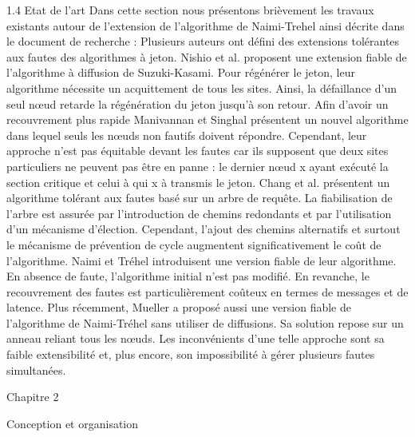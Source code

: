 \documentclass[a4paper,french,towsides,10pt]{book}
\begin{document}
1.4 Etat de l’art
Dans cette section nous présentons brièvement les travaux existants autour de l’extension de l’algorithme de Naimi-Trehel ainsi décrite dans le document de recherche :
Plusieurs auteurs ont défini des extensions tolérantes aux fautes des algorithmes à jeton. Nishio et al. proposent une extension fiable de l'algorithme à diffusion de Suzuki-Kasami.
Pour régénérer le jeton, leur algorithme nécessite un acquittement de tous les sites. Ainsi, la défaillance d'un seul nœud retarde la régénération du jeton jusqu'à son retour. Afin d'avoir un recouvrement plus rapide Manivannan et Singhal présentent un nouvel algorithme dans lequel seuls les nœuds non fautifs doivent répondre. Cependant, leur approche n'est pas équitable devant les fautes car ils supposent que deux sites particuliers ne peuvent pas être en panne : le dernier nœud x ayant exécuté la section critique et celui à qui x à transmis le jeton.
Chang et al. présentent un algorithme tolérant aux fautes basé sur un arbre de requête.
La fiabilisation de l'arbre est assurée par l'introduction de chemins redondants et par l'utilisation d'un mécanisme d'élection. Cependant, l'ajout des chemins alternatifs et surtout le mécanisme de prévention de cycle augmentent significativement le coût de l'algorithme.
Naimi et Tréhel introduisent une version fiable de leur algorithme. En absence de faute, l'algorithme initial n'est pas modifié. En revanche, le recouvrement des fautes est particulièrement coûteux en termes de messages et de latence.
Plus récemment, Mueller a proposé aussi une version fiable de l'algorithme de Naimi-Tréhel sans utiliser de diffusions. Sa solution repose sur un anneau reliant tous les nœuds.
Les inconvénients d'une telle approche sont sa faible extensibilité et, plus encore, son impossibilité à gérer plusieurs fautes simultanées.














Chapitre 2

Conception et organisation
\end{document}

